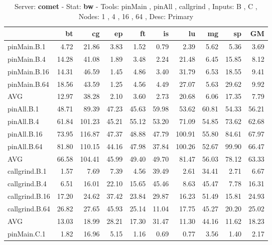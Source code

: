 \begin{table*}[]
\caption{Server: \textbf{comet} - 
 Stat: \textbf{bw} - 
 Tools: pinMain , pinAll , callgrind ,  
 Inputs: B , C ,  
 Nodes: 1 , 4 , 16 , 64 ,  
 Desc: Primary}
\label{comet_bw_pMpAcg_BC_itn_p3.5}\begin{center}
\begin{tabular}{lrrrrrrrrr}
\hline
                &    bt &     cg &    ep &    ft &    is &     lu &    mg &     sp &    GM \\
\hline
 pinMain.B.1    &  4.72 &  21.86 &  3.83 &  1.52 &  0.79 &   2.39 &  5.62 &   5.36 &  3.69 \\
 pinMain.B.4    & 14.28 &  41.08 &  1.89 &  3.48 &  2.24 &  21.48 &  6.45 &  15.85 &  8.12 \\
 pinMain.B.16   & 14.31 &  46.59 &  1.45 &  4.86 &  3.40 &  31.79 &  6.53 &  18.55 &  9.41 \\
 pinMain.B.64   & 18.56 &  43.59 &  1.25 &  4.56 &  4.49 &  27.07 &  5.63 &  29.62 &  9.92 \\
 AVG            & 12.97 &  38.28 &  2.10 &  3.60 &  2.73 &  20.68 &  6.06 &  17.35 &  7.79 \\
 pinAll.B.1     & 48.71 &  89.39 & 47.23 & 45.63 & 59.98 &  53.62 & 60.81 &  54.33 & 56.21 \\
 pinAll.B.4     & 61.84 & 101.23 & 45.21 & 55.12 & 53.20 &  71.09 & 54.85 &  73.62 & 62.68 \\
 pinAll.B.16    & 73.95 & 116.87 & 47.37 & 48.88 & 47.79 & 100.91 & 55.80 &  84.61 & 67.97 \\
 pinAll.B.64    & 81.80 & 110.15 & 44.16 & 47.98 & 37.84 & 100.26 & 52.67 &  99.90 & 66.47 \\
 AVG            & 66.58 & 104.41 & 45.99 & 49.40 & 49.70 &  81.47 & 56.03 &  78.12 & 63.33 \\
 callgrind.B.1  &  1.57 &   7.69 &  7.39 &  4.56 & 39.49 &   2.61 & 34.41 &   2.71 &  6.67 \\
 callgrind.B.4  &  6.51 &  16.01 & 22.10 & 15.65 & 45.46 &   8.63 & 45.47 &   7.78 & 16.31 \\
 callgrind.B.16 & 17.20 &  24.62 & 37.42 & 23.84 & 29.87 &  16.23 & 51.49 &  15.81 & 24.93 \\
 callgrind.B.64 & 26.82 &  27.65 & 45.93 & 25.14 & 11.04 &  17.75 & 45.27 &  20.20 & 25.02 \\
 AVG            & 13.03 &  18.99 & 28.21 & 17.30 & 31.47 &  11.30 & 44.16 &  11.62 & 18.23 \\
 pinMain.C.1    &  1.82 &  16.96 &  5.15 &  1.16 &  0.69 &   0.77 &  3.56 &   1.40 &  2.17 \\

\end{tabular}
\end{center}
\end{table*}
